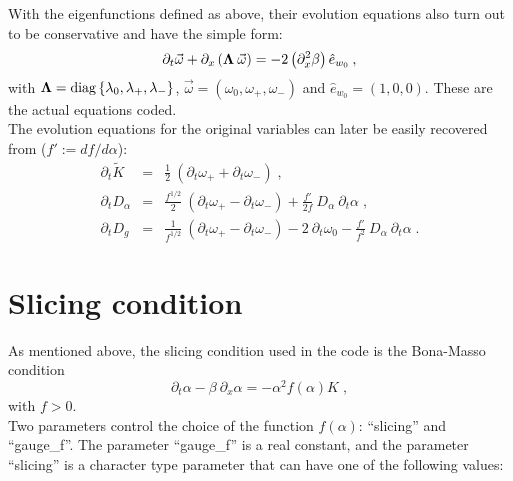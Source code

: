 \documentclass[12pt]{article}
\begin{document}
With the eigenfunctions defined as above, their evolution equations
also turn out to be conservative and have the simple form:
\begin{equation}
\partial_t \vec{\omega}
+ \partial_x \left( {\bf \Lambda} \: \vec{\omega} \right) =
- 2 \left( \partial^2_x \beta \right) \hat{e}_{w_0} \: ,
\label{eq:omegadot}
\end{equation}
with ${\bf \Lambda} = {\rm diag} \left\{ \lambda_0, \lambda_+,
\lambda_- \right\}$, $\vec{\omega}=(\omega_0, \omega_+, \omega_-)$ and
$\hat{e}_{w_0}=(1,0,0)$. These are the actual equations coded. \\

The evolution equations for the original variables can later be easily
recovered from (\mbox{$f' := d f / d \alpha$}):
\begin{eqnarray}
\partial_t \tilde{K} &=& \frac{1}{2} \: \left( \partial_t \omega_+
+ \partial_t \omega_- \right) \; , \\
\partial_t D_\alpha &=& \frac{f^{1/2}}{2} \: \left( \partial_t \omega_+
- \partial_t \omega_- \right) + \frac{f'}{2 f} \: D_\alpha \: \partial_t \alpha \; , \\
\partial_t D_g &=& \frac{1}{f^{1/2}} \: \left( \partial_t \omega_+
- \partial_t \omega_- \right)  - 2 \: \partial_t \omega_0
- \frac{f'}{f^2} \: D_\alpha \: \partial_t \alpha \; .
\end{eqnarray}



\setcounter{equation}{0}
\section{Slicing condition}
\label{sec:slicing}

As mentioned above, the slicing condition used in the code is the
Bona-Masso condition
\begin{equation}
\partial_t \alpha - \beta \: \partial_x \alpha = - \alpha^2 f(\alpha) K \; ,
\end{equation}
with $f>0$. \\

Two parameters control the choice of the function $f(\alpha)$:
``slicing'' and ``gauge\_f''.  The parameter ``gauge\_f'' is a real
constant, and the parameter ``slicing'' is a character type parameter
that can have one of the following values:
\end{document}
